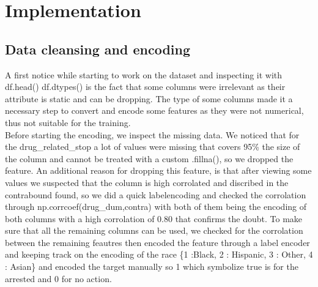 \documentclass[doctype=studienarbeit,lang=english,BCOR=15mm,biblatex]{ldvbook}
\begin{document}
{\let\clearpage\relax\par \chapter{Implementation}}
\section{Data cleansing and encoding}
A first notice while starting to work on the dataset and inspecting it with 
df.head() 
df.dtypes()
is the fact that some columns were irrelevant as their attribute is static and can be dropping. The type of some columns made it a  necessary step to convert and encode some features as they were not numerical, thus not suitable for the training.\\
Before starting the encoding, we inspect the missing data. We noticed that for the drug\_related\_stop a lot of values were missing that covers 95\% the size of the column and cannot be treated with a custom .fillna(), so we dropped the feature. An additional reason for dropping this feature, is that after viewing some values we suspected that the column is high corrolated and discribed in the contrabound found, so we did a quick labelencoding and checked the corrolation through np.corrcoef(drug\_dum,contra) with both of them being the encoding of both columns with a high corrolation of 0.80 that confirms the doubt.
To make sure that all the remaining columns can be used, we checked for the corrolation between the remaining feautres then encoded the feature through a label encoder and keeping track on the encoding of the race \{1 :Black, 2 : Hispanic, 3 : Other, 4 : Asian\} and encoded the target manually so 1 which symbolize true is for the arrested and 0 for no action.
\end{document}
